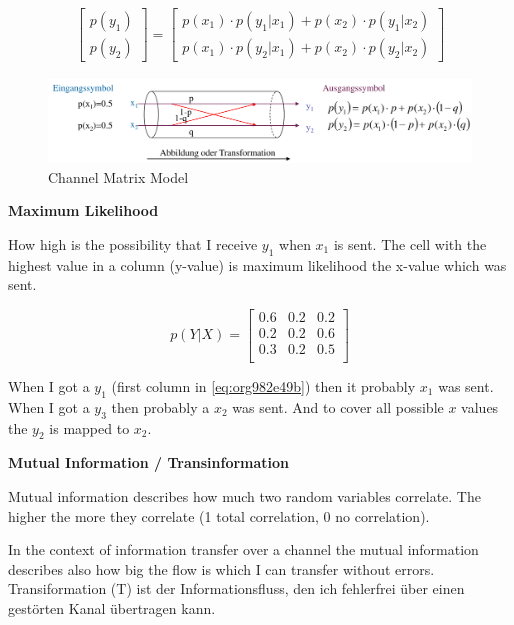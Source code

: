 \documentclass[11pt,twoside,twocolumn,landscape]{article}
\begin{document}
\begin{align}
  \begin{bmatrix}
    p(y_1) \\
    p(y_2)
  \end{bmatrix}
  = 
  \begin{bmatrix}
    p(x_1) \cdot p(y_1 | x_1) + p(x_2) \cdot p(y_1|x_2) \\
    p(x_1) \cdot p(y_2 | x_1) + p(x_2) \cdot p(y_2|x_2)
  \end{bmatrix}
\end{align}

\begin{figure}[htbp]
\centering
\includegraphics[width=.9\linewidth]{img/kanalmatrix_modell.png}
\caption{\label{fig:orgc789d1a}Channel Matrix Model}
\end{figure}

\textbf{Maximum Likelihood}

How high is the possibility that I receive \(y_1\) when \(x_1\) is sent.
The cell with the highest value in a column (y-value) is maximum likelihood the x-value which was sent.

\begin{equation}
\label{eq:org982e49b}
  p(Y|X) =
  \begin{bmatrix}
    0.6 & 0.2 & 0.2 \\
    0.2 & 0.2 & 0.6 \\
    0.3 & 0.2 & 0.5 \\
  \end{bmatrix}
\end{equation}

When I got a \(y_1\) (first column in \ref{eq:org982e49b}) then it probably \(x_1\) was sent.
When I got a \(y_3\) then probably a \(x_2\) was sent.
And to cover all possible \(x\) values the \(y_2\) is mapped to \(x_2\).

\textbf{Mutual Information / Transinformation}

Mutual information describes how much two random variables correlate.
The higher the more they correlate (1 total correlation, 0 no correlation).

In the context of information transfer over a channel the mutual information describes also how big the flow is which I can transfer without errors.
Transiformation (T) ist der Informationsfluss, den ich fehlerfrei über einen gestörten Kanal übertragen kann.
\end{document}
